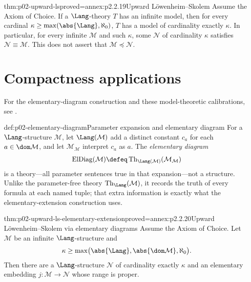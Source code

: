 \begin{hbtheorem}{thm:p02-upward-ls}{proved=annex:p2.2.19}{Upward L\"owenheim--Skolem}
Assume the Axiom of Choice.  If a \(\Lang\)-theory \(T\) has an infinite
model, then for every cardinal
\(\kappa\geq\max(\abs{\Lang},\aleph_0)\), \(T\) has a model of cardinality
exactly \(\kappa\).  In particular, for every infinite \(\mathcal M\) and
such \(\kappa\), some \(\mathcal N\) of cardinality \(\kappa\) satisfies
\(\mathcal N\equiv\mathcal M\).  This does not assert that
\(\mathcal M\preccurlyeq\mathcal N\).
\end{hbtheorem}

\section{Compactness applications}
\label{sec:p02-first-order-compactness-applications}

For the elementary-diagram construction and these model-theoretic
calibrations, see \cite{Hodges1993,Marker2002}.

\begin{hbdefinition}{def:p02-elementary-diagram}{Parameter expansion and elementary diagram}
For a \(\Lang\)-structure \(\mathcal M\), let
\(\Lang(\mathcal M)\) add a distinct constant \(c_a\) for each
\(a\in\dom\mathcal M\), and let \(\mathcal M_{\mathcal M}\) interpret
\(c_a\) as \(a\).  The \emph{elementary diagram}
\[
 \operatorname{ElDiag}(\mathcal M)
 \defeq
 \operatorname{Th}_{\Lang(\mathcal M)}(\mathcal M_{\mathcal M})
\]
is a theory---all parameter sentences true in that expansion---not a
structure.  Unlike the parameter-free theory
\(\operatorname{Th}_{\Lang}(\mathcal M)\), it records the truth of every
formula at each named tuple; that extra information is exactly what the
elementary-extension construction uses.
\end{hbdefinition}

\begin{hbtheorem}{thm:p02-upward-ls-elementary-extension}{proved=annex:p2.2.20}{Upward L\"owenheim--Skolem via elementary diagrams}
Assume the Axiom of Choice.  Let \(\mathcal M\) be an infinite
\(\Lang\)-structure and
\[
 \kappa\geq
 \max\bigl(\abs{\Lang},\abs{\dom\mathcal M},\aleph_0\bigr).
\]
Then there are a \(\Lang\)-structure \(\mathcal N\) of cardinality exactly
\(\kappa\) and an elementary embedding
\(j:\mathcal M\to\mathcal N\) whose range is proper.
\end{hbtheorem}

